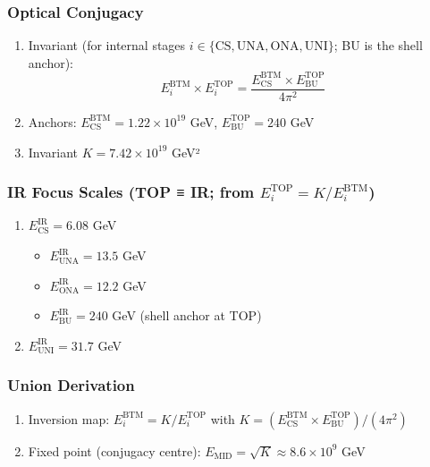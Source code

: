\documentclass[11pt,a4paper]{article}
\theoremstyle{definition}
\theoremstyle{remark}
\begin{document}
\subsubsection{Optical Conjugacy}
\begin{enumerate}
\item Invariant (for internal stages $i \in \{\mathrm{CS}, \mathrm{UNA}, \mathrm{ONA}, \mathrm{UNI}\}$; BU is the shell anchor):
\[
E_i^{\mathrm{BTM}} \times E_i^{\mathrm{TOP}} = \frac{E_{\mathrm{CS}}^{\mathrm{BTM}} \times E_{\mathrm{BU}}^{\mathrm{TOP}}}{4\pi^2}
\]
\item Anchors: $E_{\mathrm{CS}}^{\mathrm{BTM}} = 1.22 \times 10^{19}$ GeV, $E_{\mathrm{BU}}^{\mathrm{TOP}} = 240$ GeV
\item Invariant $K = 7.42 \times 10^{19}$ GeV²
\end{enumerate}

\subsubsection{IR Focus Scales (TOP ≡ IR; from $E_i^{\mathrm{TOP}} = K / E_i^{\mathrm{BTM}}$)}
\begin{enumerate}
\item $E_{\mathrm{CS}}^{\mathrm{IR}} = 6.08$ GeV
\begin{itemize}
\item $E_{\mathrm{UNA}}^{\mathrm{IR}} = 13.5$ GeV
\item $E_{\mathrm{ONA}}^{\mathrm{IR}} = 12.2$ GeV
\item $E_{\mathrm{BU}}^{\mathrm{IR}} = 240$ GeV (shell anchor at TOP)
\end{itemize}
\item $E_{\mathrm{UNI}}^{\mathrm{IR}} = 31.7$ GeV
\end{enumerate}

\subsubsection{Union Derivation}
\begin{enumerate}
\item Inversion map: $E_i^{\mathrm{BTM}} = K / E_i^{\mathrm{TOP}}$ with $K = (E_{\mathrm{CS}}^{\mathrm{BTM}} \times E_{\mathrm{BU}}^{\mathrm{TOP}}) / (4\pi^2)$
\item Fixed point (conjugacy centre): $E_{\mathrm{MID}} = \sqrt{K} \approx 8.6 \times 10^9$ GeV
\end{enumerate}
\end{document}
